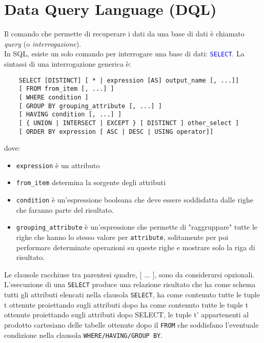 \documentclass[12pt,a4paper]{book}
\begin{document}
	\chapter{Data Query Language (DQL)}
	Il comando che permette di recuperare i dati da una base di dati è chiamato \textit{query} (o \textit{interrogazione}).\\
	In SQL, esiste un solo comando per interrogare una base di dati: \textcolor{blue}{\texttt{SELECT}}. La sintassi di una interrogazione generica è:
	\begin{lstlisting}
	SELECT [DISTINCT] [ * | expression [AS] output_name [, ...]]
	[ FROM from_item [, ...] ]
	[ WHERE condition ]
	[ GROUP BY grouping_attribute [, ...] ]
	[ HAVING condition [, ...] ]
	[ { UNION | INTERSECT | EXCEPT } [ DISTINCT ] other_select ]
	[ ORDER BY expression [ ASC | DESC | USING operator]]
	\end{lstlisting}
	dove:
	\begin{itemize}
		\item \texttt{expression} è un attributo
		\item \texttt{from_item} determina la sorgente degli attributi
		\item \texttt{condition} è un'espressione booleana che deve essere soddisfatta dalle righe che faranno parte del risultato.
		\item \texttt{grouping_attribute} è un'espressione che permette di "raggruppare" tutte le righe che hanno lo stesso valore per \texttt{attribute}, solitamente per poi performare determinate operazioni su queste righe e mostrare solo la riga di risultato.
	\end{itemize}
	Le clausole racchiuse tra parentesi quadre, [ ... ], sono da considerarsi opzionali.	\\L’esecuzione di una \texttt{SELECT} produce una relazione risultato che ha come schema tutti gli attributi elencati nella clausola \texttt{SELECT}, ha come contenuto tutte le tuple t ottenute proiettando sugli attributi dopo ha come contenuto tutte le tuple t ottenute proiettando sugli attributi dopo SELECT, le tuple t' appartenenti al prodotto cartesiano delle tabelle ottenute dopo il \texttt{FROM} che soddisfano l’eventuale condizione nella clausola \texttt{WHERE/HAVING/GROUP BY}.
\end{document}
